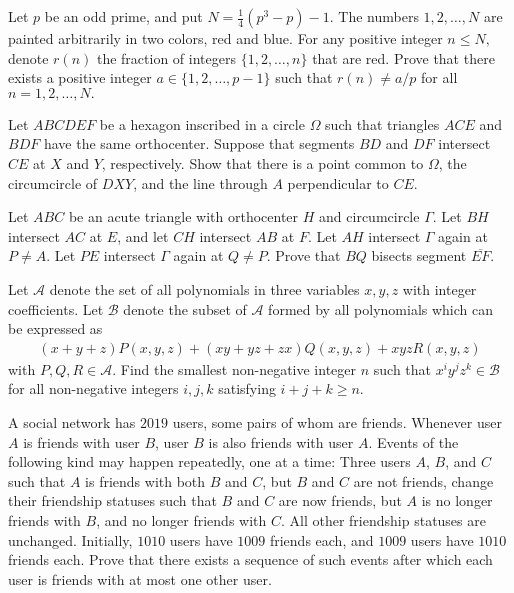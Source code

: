 \documentclass[11pt]{scrartcl}
\begin{document}
\begin{problem}[47893544380608]
	Let $p$ be an odd prime, and put $N=\frac{1}{4} (p^3 -p) -1.$ The numbers $1,2, \dots, N$ are painted arbitrarily in two colors, red and blue. For any positive integer $n \leqslant N,$ denote $r(n)$ the fraction of integers $\{ 1,2, \dots, n \}$ that are red.
Prove that there exists a positive integer $a \in \{ 1,2, \dots, p-1\}$ such that $r(n) \neq a/p$ for all $n = 1,2, \dots , N.$
\end{problem}
\begin{problem}[639126468624733]
Let $ABCDEF$ be a hexagon inscribed in a circle $\Omega$ such that triangles $ACE$ and $BDF$ have the same orthocenter. Suppose that segments $BD$ and $DF$ intersect $CE$ at $X$ and $Y$, respectively. Show that there is a point common to $\Omega$, the circumcircle of $DXY$, and the line through $A$ perpendicular to $CE$.
\end{problem}
\begin{problem}[8528437132500966626]
	Let $ABC$ be an acute triangle with orthocenter $H$ and circumcircle $\Gamma$. Let $BH$ intersect $AC$ at $E$, and let $CH$ intersect $AB$ at $F$. Let $AH$ intersect $\Gamma$ again at $P \neq A$. Let $PE$ intersect $\Gamma$ again at $Q \neq P$. Prove that $BQ$ bisects segment $\overline{EF}$.
\end{problem}
\begin{problem}[712971117639738]
Let $\mathcal{A}$ denote the set of all polynomials in three variables $x, y, z$ with integer coefficients. Let $\mathcal{B}$ denote the subset of $\mathcal{A}$ formed by all polynomials which can be expressed as
\begin{align*}
(x + y + z)P(x, y, z) + (xy + yz + zx)Q(x, y, z) + xyzR(x, y, z)
\end{align*}with $P, Q, R \in \mathcal{A}$. Find the smallest non-negative integer $n$ such that $x^i y^j z^k \in \mathcal{B}$ for all non-negative integers $i, j, k$ satisfying $i + j + k \geq n$.
\end{problem}
\begin{problem}[8690567757444826166]
	A social network has $2019$ users, some pairs of whom are friends. Whenever user $A$ is friends with user $B$, user $B$ is also friends with user $A$. Events of the following kind may happen repeatedly, one at a time:
Three users $A$, $B$, and $C$ such that $A$ is friends with both $B$ and $C$, but $B$ and $C$ are not friends, change their friendship statuses such that $B$ and $C$ are now friends, but $A$ is no longer friends with $B$, and no longer friends with $C$. All other friendship statuses are unchanged.
Initially, $1010$ users have $1009$ friends each, and $1009$ users have $1010$ friends each. Prove that there exists a sequence of such events after which each user is friends with at most one other user.

\end{problem}
\end{document}
